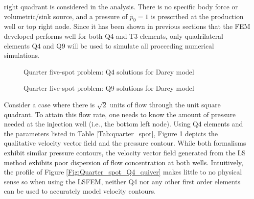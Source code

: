 \documentclass[11pt,reqno]{amsart}
\begin{document}
right quadrant is considered in the analysis. There is no specific body force or volumetric/sink source, and 
a pressure of $\bar{p}_0 = 1$ is prescribed at the production well or top right node.
Since it has been shown in previous sections that the FEM developed performs well for both Q4 and T3 elements, 
only quadrilateral elements Q4 and Q9 will be used to simulate all proceeding numerical simulations.
\begin{figure}[t!]
  \centering
  \label{Fig:Quarter_spot_Q4_quiver}
  \caption{Quarter five-spot problem: Q4 solutions for Darcy model}
  \label{Fig:Quarter_spot_Q4_D}
\end{figure}
\begin{figure}[t!]
  \centering
  \caption{Quarter five-spot problem: Q9 solutions for Darcy model}
  \label{Fig:Quarter_spot_Q9_D}
\end{figure}

Consider a case where there is $\sqrt{2}$ units of flow through the unit 
square quadrant. To attain this flow rate, one needs to know the
amount of pressure needed at the injection well (i.e., the bottom left node). 
Using Q4 elements and the parameters listed in Table \ref{Tab:quarter_spot}, 
Figure \ref{Fig:Quarter_spot_Q4_D} depicts the qualitative velocity vector field and the 
pressure contour. While both formalisms exhibit similar pressure contours, the velocity 
vector field generated from the LS method exhibits poor dispersion of flow concentration 
at both wells. Intuitively, the profile of Figure \ref{Fig:Quarter_spot_Q4_quiver} makes 
little to no physical sense so when using the LSFEM, neither Q4 nor any other first 
order elements can be used to accurately model velocity contours.
\end{document}

